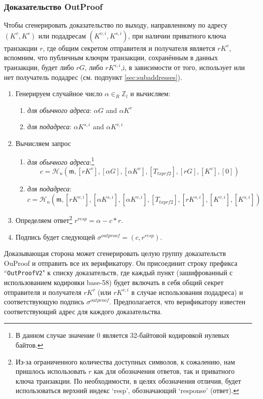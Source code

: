 \subsubsection*{Доказательство OutProof}

Чтобы сгенерировать доказательство по выходу, направленному по адресу $(K^{v},K^{s})$ или подад\-ресам $(K^{v,i},K^{s,i})$, при наличии приватного ключа транзакции $r$, где общим секретом отправи\-теля и получателя является $rK^v$, вспомним, что публичным ключрм транзакции, сохранённым в данных транзакции, будет либо $rG$, либо $rK^{s,i}$,i, в зависимости от того, использует или нет получатель подадрес (см. подпункт \ref{sec:subaddresses}).

\begin{enumerate}
	\item Генерируем случайное число $\alpha \in_R \mathbb{Z}_l$ и вычисляем:
	\begin{enumerate}
	    \item {\em для обычного адреса}: $\alpha G$ and $\alpha K^v$
	    \item {\em для подадреса}: $\alpha K^{s,i}$ and $\alpha K^{v,i}$
	\end{enumerate}{}
	\item Вычисляем запрос
	\begin{enumerate}
	    \item {\em для обычного адреса}:\footnote{В данном случае значение 0 является 32-байтовой кодировкой нулевых байтов.}
	    \[c = \mathcal{H}_n(\mathfrak{m},[rK^v], [\alpha G], [\alpha K^v], [T_{txprf2}], [rG], [K^v], [0])\]
	    \item {\em для подадреса}:
	    \[c = \mathcal{H}_n(\mathfrak{m},[rK^{v,i}], [\alpha K^{s,i}], [\alpha K^{v,i}], [T_{txprf2}], [rK^{s,i}], [K^{v,i}], [K^{s,i}])\]
	\end{enumerate}{}
	\item Определяем ответ\footnote{Из-за ограниченного количества доступных символов, к сожалению, нам пришлось использовать $r$ как для обозначения ответов, так и приватного ключа транзакции. По необходимости, в целях обозначения отличия, будет использоваться верхний индекс `resp', обозначающий `response' (ответ).} $r^{resp} = \alpha - c*r$.
	\item Подпись будет следующей $\sigma^{outproof} = (c, r^{resp})$.
\end{enumerate}{}

Доказывающая сторона может сгенерировать целую группу доказательств OuProof и отпра\-вить все их верификатору. Он присоединит строку префикса ``{\tt OutProofV2}" к списку доказа\-тельств, где каждый пункт (зашифрованный с использованием кодировки base-58) будет включать в себя общий секрет отправителя и получателя $r K^v$ (или $r K^{v,i}$ в случае использова\-ния подадреса) и соответствующую подпись $\sigma^{outproof}$. Предполагается, что верификатору известен соответствующий адрес для каждого доказательства.


